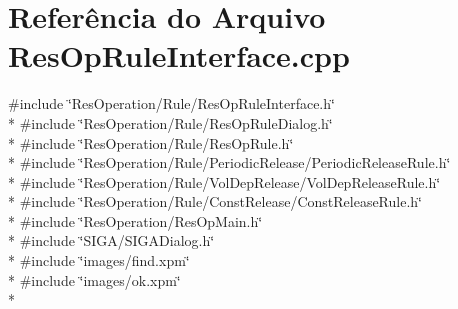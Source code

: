 \section{Referência do Arquivo Res\+Op\+Rule\+Interface.\+cpp}
\label{_rule_2_res_op_rule_interface_8cpp}
{\ttfamily \#include \char`\"{}Res\+Operation/\+Rule/\+Res\+Op\+Rule\+Interface.\+h\char`\"{}}\\*
{\ttfamily \#include \char`\"{}Res\+Operation/\+Rule/\+Res\+Op\+Rule\+Dialog.\+h\char`\"{}}\\*
{\ttfamily \#include \char`\"{}Res\+Operation/\+Rule/\+Res\+Op\+Rule.\+h\char`\"{}}\\*
{\ttfamily \#include \char`\"{}Res\+Operation/\+Rule/\+Periodic\+Release/\+Periodic\+Release\+Rule.\+h\char`\"{}}\\*
{\ttfamily \#include \char`\"{}Res\+Operation/\+Rule/\+Vol\+Dep\+Release/\+Vol\+Dep\+Release\+Rule.\+h\char`\"{}}\\*
{\ttfamily \#include \char`\"{}Res\+Operation/\+Rule/\+Const\+Release/\+Const\+Release\+Rule.\+h\char`\"{}}\\*
{\ttfamily \#include \char`\"{}Res\+Operation/\+Res\+Op\+Main.\+h\char`\"{}}\\*
{\ttfamily \#include \char`\"{}S\+I\+G\+A/\+S\+I\+G\+A\+Dialog.\+h\char`\"{}}\\*
{\ttfamily \#include \char`\"{}images/find.\+xpm\char`\"{}}\\*
{\ttfamily \#include \char`\"{}images/ok.\+xpm\char`\"{}}\\*
